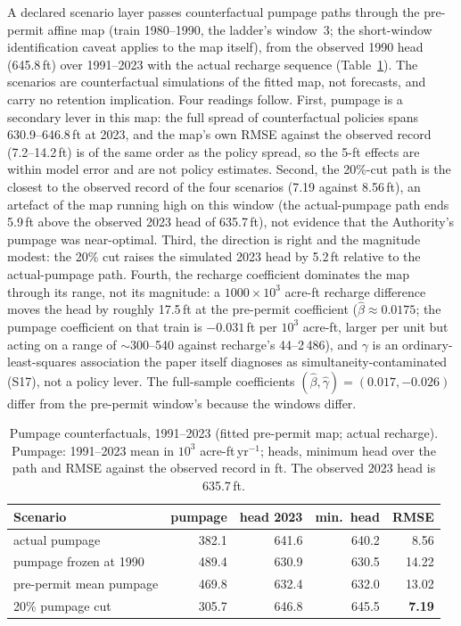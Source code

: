 \documentclass[preprint,11pt,authoryear]{elsarticle}
\theoremstyle{remark}
\begin{document}
A declared scenario layer passes counterfactual pumpage paths through the pre-permit affine map (train 1980--1990, the ladder's window~3; the short-window identification caveat applies to the map itself), from the observed 1990 head (645.8\,ft) over 1991--2023 with the actual recharge sequence (Table~\ref{tab:si_pumpage}). The scenarios are counterfactual simulations of the fitted map, not forecasts, and carry no retention implication. Four readings follow. First, pumpage is a secondary lever in this map: the full spread of counterfactual policies spans 630.9--646.8\,ft at 2023, and the map's own RMSE against the observed record (7.2--14.2\,ft) is of the same order as the policy spread, so the 5-ft effects are within model error and are not policy estimates. Second, the 20\%-cut path is the closest to the observed record of the four scenarios (7.19 against 8.56\,ft), an artefact of the map running high on this window (the actual-pumpage path ends 5.9\,ft above the observed 2023 head of 635.7\,ft), not evidence that the Authority's pumpage was near-optimal. Third, the direction is right and the magnitude modest: the 20\% cut raises the simulated 2023 head by 5.2\,ft relative to the actual-pumpage path. Fourth, the recharge coefficient dominates the map through its range, not its magnitude: a $1000\times10^3$ acre-ft recharge difference moves the head by roughly 17.5\,ft at the pre-permit coefficient ($\hat\beta\approx0.0175$; the pumpage coefficient on that train is $-0.031$\,ft per $10^3$ acre-ft, larger per unit but acting on a range of $\sim$300--540 against recharge's 44--2\,486), and $\gamma$ is an ordinary-least-squares association the paper itself diagnoses as simultaneity-contaminated (S17), not a policy lever. The full-sample coefficients $(\hat\beta,\hat\gamma)=(0.017,-0.026)$ differ from the pre-permit window's because the windows differ.

\begin{table}[!htb]
\centering\footnotesize\setlength{\tabcolsep}{3.5pt}
\caption{Pumpage counterfactuals, 1991--2023 (fitted pre-permit map; actual recharge). Pumpage: 1991--2023 mean in $10^3$ acre-ft\,yr$^{-1}$; heads, minimum head over the path and RMSE against the observed record in ft. The observed 2023 head is 635.7\,ft.}
\label{tab:si_pumpage}
\begin{tabular}{@{}lrrrr@{}}
\toprule
Scenario & pumpage & head 2023 & min.\ head & RMSE \\
\midrule
actual pumpage & 382.1 & 641.6 & 640.2 & 8.56 \\
pumpage frozen at 1990 & 489.4 & 630.9 & 630.5 & 14.22 \\
pre-permit mean pumpage & 469.8 & 632.4 & 632.0 & 13.02 \\
20\% pumpage cut & 305.7 & 646.8 & 645.5 & \textbf{7.19} \\
\bottomrule
\end{tabular}
\end{table}
\end{document}
